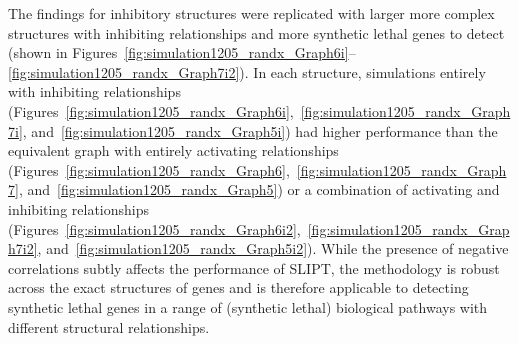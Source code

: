 
The findings for inhibitory  structures were replicated with larger more complex  structures with inhibiting relationships and more \gls{synthetic lethal} genes to detect (shown in Figures~\ref{fig:simulation1205_randx_Graph6i}\nobreakdash--\ref{fig:simulation1205_randx_Graph7i2}). In each  structure, simulations entirely with inhibiting relationships (Figures~\ref{fig:simulation1205_randx_Graph6i},~\ref{fig:simulation1205_randx_Graph7i}, and~\ref{fig:simulation1205_randx_Graph5i}) had higher performance than the equivalent graph with entirely activating relationships (Figures~\ref{fig:simulation1205_randx_Graph6},~\ref{fig:simulation1205_randx_Graph7}, and~\ref{fig:simulation1205_randx_Graph5}) or a combination of activating and inhibiting relationships (Figures~\ref{fig:simulation1205_randx_Graph6i2},~\ref{fig:simulation1205_randx_Graph7i2}, and~\ref{fig:simulation1205_randx_Graph5i2}). 
While the presence of negative correlations subtly affects the performance of \gls{SLIPT}, the methodology is robust across the exact structures of genes and is therefore applicable to detecting \gls{synthetic lethal} genes in a range of (synthetic lethal) biological pathways with different structural relationships.



